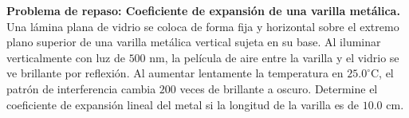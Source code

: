 \item \textbf{Problema de repaso: Coeficiente de expansión de una varilla metálica.}
Una lámina plana de vidrio se coloca de forma fija y horizontal sobre el extremo plano superior de una varilla metálica vertical sujeta en su base. Al iluminar verticalmente con luz de $500\text{ nm}$, la película de aire entre la varilla y el vidrio se ve brillante por reflexión. Al aumentar lentamente la temperatura en $25.0^\circ\text{C}$, el patrón de interferencia cambia $200$ veces de brillante a oscuro. Determine el coeficiente de expansión lineal del metal si la longitud de la varilla es de $10.0\text{ cm}$.